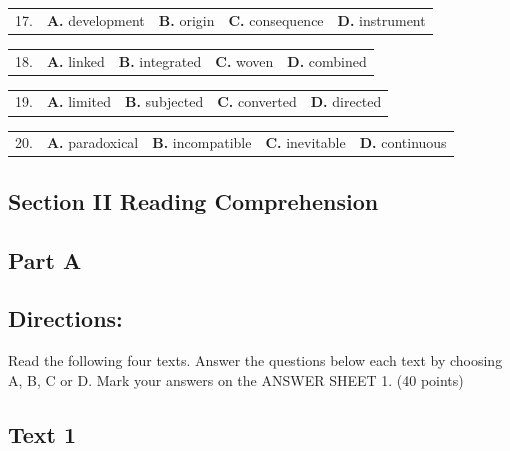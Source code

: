 \documentclass[UTF8,11pt]{ctexart}
\begin{document}
\noindent\begin{tabularx}{\linewidth}{@{}lXXXX@{}}17. & \textbf{A.} development & \textbf{B.} origin & \textbf{C.} consequence & \textbf{D.} instrument\\\end{tabularx}\par

\noindent\begin{tabularx}{\linewidth}{@{}lXXXX@{}}18. & \textbf{A.} linked & \textbf{B.} integrated & \textbf{C.} woven & \textbf{D.} combined\\\end{tabularx}\par

\noindent\begin{tabularx}{\linewidth}{@{}lXXXX@{}}19. & \textbf{A.} limited & \textbf{B.} subjected & \textbf{C.} converted & \textbf{D.} directed\\\end{tabularx}\par

\noindent\begin{tabularx}{\linewidth}{@{}lXXXX@{}}20. & \textbf{A.} paradoxical & \textbf{B.} incompatible & \textbf{C.} inevitable & \textbf{D.} continuous\\\end{tabularx}\par

\subsection*{\textbf{Section II Reading Comprehension}}


\subsection*{\textbf{Part A}}


\subsection*{\textbf{Directions:}}


Read the following four texts. Answer the questions below each text by choosing A, B, C or D. Mark your answers on the ANSWER SHEET 1. (40 points)


\subsection*{\textbf{Text 1}}
\end{document}
